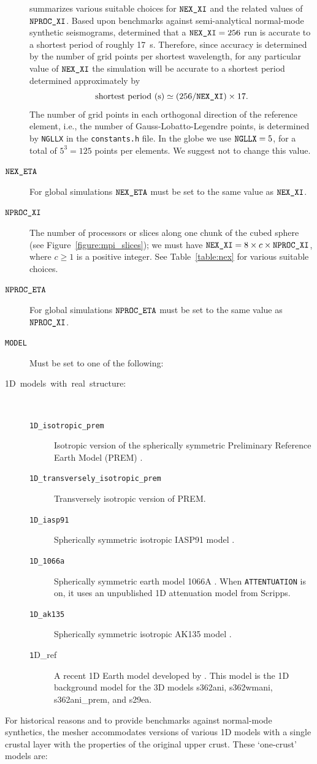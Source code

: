 \documentclass[oneside,english]{book}
\newcommand{\nexxi}{\mbox{\texttt{NEX\_XI}}}
\newcommand{\nexeta}{\mbox{\texttt{NEX\_ETA}}}
\newcommand{\nprocxi}{\mbox{\texttt{NPROC\_XI}}}
\newcommand{\nproceta}{\mbox{\texttt{NPROC\_ETA}}}
\begin{document}
\begin{description}
summarizes various suitable choices for $\nexxi$ and the related
values of $\nprocxi$. Based upon benchmarks against semi-analytical
normal-mode synthetic seismograms, \citet{KoTr02a,KoTr02b} determined
that a $\nexxi=256$ run is accurate to a shortest period of roughly
17~s. Therefore, since accuracy is determined by the number of grid
points per shortest wavelength, for any particular value of $\nexxi$
the simulation will be accurate to a shortest period determined approximately
by \begin{equation}
\mbox{shortest period (s)}\simeq(256/\nexxi)\times17.\label{eq:shortest_period}\end{equation}
 The number of grid points in each orthogonal direction of the reference
element, i.e., the number of Gauss-Lobatto-Legendre points, is determined
by \texttt{NGLLX} in the \texttt{constants.h} file. In the globe we
use $\mbox{\texttt{NGLLX}}=5$, for a total of $5^{3}=125$ points
per elements. We suggest not to change this value.
\item [{$\nexeta$}] For global simulations $\nexeta$ must be set to the
same value as $\nexxi$.
\item [{$\nprocxi$}] The number of processors or slices along one chunk
of the cubed sphere (see Figure~\ref{figure:mpi_slices}); we must
have $\nexxi=8\times c\times\nprocxi$, where $c\ge1$ is a positive
integer. See Table~\ref{table:nex} for various suitable choices.
\item [{$\nproceta$}] For global simulations $\nproceta$ must be set
to the same value as $\nprocxi$.
\item [{\texttt{MODEL}}] Must be set to one of the following:
\item [{\textmd{1D~models~with~real~structure:}}]~

\begin{description}
\item [{\texttt{1D\_isotropic\_prem}}] Isotropic version of the spherically
symmetric Preliminary Reference Earth Model (PREM) \citep{DzAn81}.
\item [{\texttt{1D\_transversely\_isotropic\_prem}}] Transversely isotropic
version of PREM.
\item [{\texttt{1D\_iasp91}}] Spherically symmetric isotropic IASP91 model
\citep{KeEn91}.
\item [{\texttt{1D\_1066a}}] Spherically symmetric earth model 1066A \citep{gilbertdziewonski1975}.
When \texttt{\small ATTENTUATION} is on, it uses an unpublished 1D
attenuation model from Scripps.
\item [{\texttt{1D\_ak135}}] Spherically symmetric isotropic AK135 model
\citep{KeEnBu95}.
\item [{\texttt{1}D\_ref}] A recent 1D Earth model developed by \citet{KuDzEk06}.
This model is the 1D background model for the 3D models s362ani, s362wmani,
s362ani\_prem, and s29ea.
\end{description}
\end{description}
For historical reasons and to provide benchmarks against normal-mode
synthetics, the mesher accommodates versions of various 1D models
with a single crustal layer with the properties of the original upper
crust. These `one-crust' models are:
\end{document}

